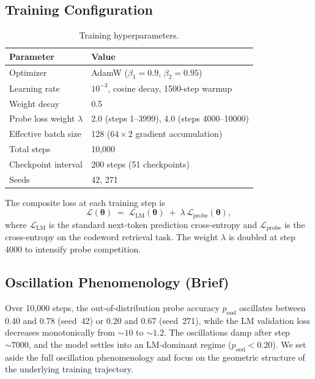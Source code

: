 \documentclass[11pt,a4paper]{article}
\begin{document}
\subsection{Training Configuration}

\begin{table}[h]
\centering
\caption{Training hyperparameters.}
\label{tab:hyperparams}
\begin{tabular}{@{}ll@{}}
\toprule
\textbf{Parameter} & \textbf{Value} \\
\midrule
Optimizer              & AdamW ($\beta_1{=}0.9$, $\beta_2{=}0.95$) \\
Learning rate          & $10^{-3}$, cosine decay, 1500-step warmup \\
Weight decay           & 0.5 \\
Probe loss weight $\lambda$ & 2.0 (steps 1--3999), 4.0 (steps 4000--10000) \\
Effective batch size   & 128 ($64 \times 2$ gradient accumulation) \\
Total steps            & 10{,}000 \\
Checkpoint interval    & 200 steps (51 checkpoints) \\
Seeds                  & 42, 271 \\
\bottomrule
\end{tabular}
\end{table}

The composite loss at each training step is
\begin{equation}\label{eq:composite-loss}
    \mathcal{L}(\bm{\theta}) \;=\; \mathcal{L}_{\mathrm{LM}}(\bm{\theta})
    \;+\; \lambda\,\mathcal{L}_{\mathrm{probe}}(\bm{\theta}),
\end{equation}
where $\mathcal{L}_{\mathrm{LM}}$ is the standard next-token prediction
cross-entropy and $\mathcal{L}_{\mathrm{probe}}$ is the cross-entropy on the
codeword retrieval task.  The weight $\lambda$ is doubled at step 4000 to
intensify probe competition.

\subsection{Oscillation Phenomenology (Brief)}

Over 10{,}000 steps, the out-of-distribution probe accuracy $p_{\mathrm{ood}}$
oscillates between 0.40 and 0.78 (seed~42) or 0.20 and 0.67 (seed~271), while
the LM validation loss decreases monotonically from ${\sim}10$ to ${\sim}1.2$.
The oscillations damp after step ${\sim}7000$, and the model settles into an
LM-dominant regime ($p_{\mathrm{ood}} < 0.20$).  We set aside the full
oscillation phenomenology and focus on the geometric structure of the underlying
training trajectory.
\end{document}
